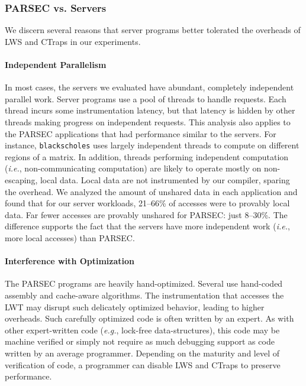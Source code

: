 \documentclass[pageno,nohyperref]{jpaper}
\newcommand{\ctraps}{CTraps\xspace}
\newcommand{\lws}{LWS\xspace}
\newcommand{\lwt}{LWT\xspace}
\begin{document}
\subsubsection{PARSEC vs. Servers}
\label{sec:eval:parsecserver}
We discern several reasons that server programs better tolerated the overheads of
\lws and \ctraps in our experiments.

\paragraph{Independent Parallelism}
In most cases, the servers we evaluated have abundant, completely independent
parallel work.  Server programs use a pool of threads to handle requests.  Each
thread incurs some instrumentation latency, but that latency is hidden by other
threads making progress on independent requests.  This analysis also applies to
the PARSEC applications that had performance similar to the servers.  For
instance, {\tt blackscholes} uses largely independent threads to compute on
different regions of a matrix.  In addition, threads performing independent
computation ({\em i.e.}, non-communicating computation) are likely to operate
mostly on non-escaping, local data.  Local data are not instrumented by our
compiler, sparing the overhead.  We analyzed the amount of unshared data in
each application and found that for our server workloads, 21--66\% of accesses
were to provably local data.  Far fewer accesses are provably unshared for
PARSEC: just 8--30\%. The difference supports the fact that the servers have
more independent work ({\em i.e.}, more local accesses) than PARSEC. 



\paragraph{Interference with Optimization}
The PARSEC programs are heavily hand-optimized. Several use hand-coded assembly
and cache-aware algorithms.  The instrumentation that accesses the \lwt may
disrupt such delicately optimized behavior, leading to higher overheads.  Such
carefully optimized code is often written by an expert.  As with other
expert-written code ({\em e.g.}, lock-free data-structures), this code may be
machine verified or simply not require as much debugging support as code written by an
average programmer.  Depending on the maturity and level of verification of
code, a programmer can disable \lws and \ctraps to preserve performance. 
 
\end{document}

